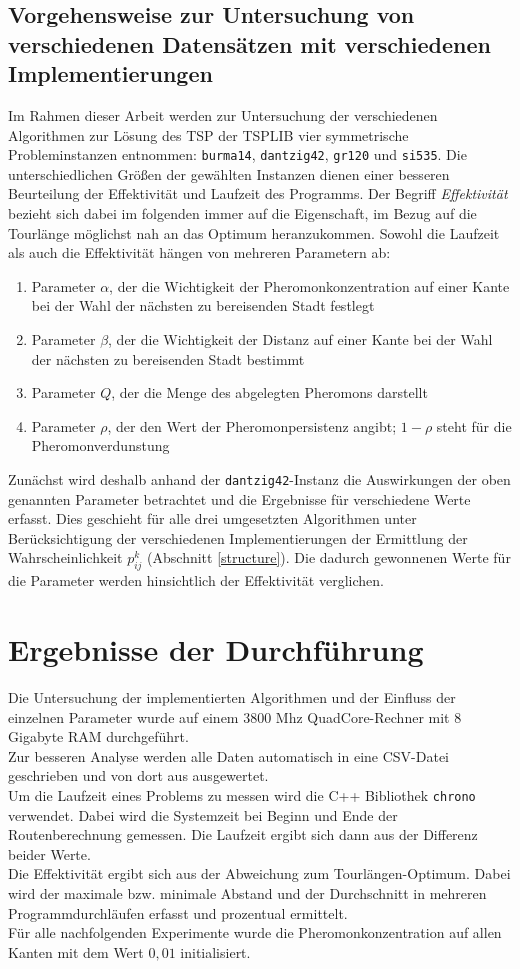 \documentclass[doktyp=barbeit, sprache=german]{TUBAFarbeiten}
\begin{document}
\subsection{Vorgehensweise zur Untersuchung von verschiedenen Datensätzen mit verschiedenen Implementierungen}
\label{sec:vorgehensweise}
Im Rahmen dieser Arbeit werden zur Untersuchung der verschiedenen Algorithmen zur Lösung des TSP der TSPLIB vier symmetrische Probleminstanzen entnommen: \texttt{burma14}, \texttt{dantzig42}, \texttt{gr120} und \texttt{si535}.
Die unterschiedlichen Größen der gewählten Instanzen dienen einer besseren Beurteilung der Effektivität und Laufzeit des Programms.
Der Begriff \textit{Effektivität} bezieht sich dabei im folgenden immer auf die Eigenschaft, im Bezug auf die Tourlänge möglichst nah an das Optimum heranzukommen. Sowohl die Laufzeit als auch die Effektivität hängen von mehreren Parametern ab:
\begin{enumerate}
\item Parameter $\alpha$, der die Wichtigkeit der Pheromonkonzentration auf einer Kante bei der Wahl der nächsten zu bereisenden Stadt festlegt
\item Parameter $\beta$, der die Wichtigkeit der Distanz auf einer Kante bei der Wahl der nächsten zu bereisenden Stadt bestimmt
\item Parameter $Q$, der die Menge des abgelegten Pheromons darstellt
\item Parameter $\rho$, der den Wert der Pheromonpersistenz angibt; $1 - \rho$ steht für die Pheromonverdunstung
\end{enumerate}
\newpage
Zunächst wird deshalb anhand der \texttt{dantzig42}-Instanz die Auswirkungen der oben genannten Parameter betrachtet und die Ergebnisse für verschiedene Werte erfasst.
Dies geschieht für alle drei umgesetzten Algorithmen unter Berücksichtigung der verschiedenen Implementierungen der Ermittlung der Wahrscheinlichkeit $p^k_{ij}$ (Abschnitt \ref{structure}).
Die dadurch gewonnenen Werte für die Parameter werden hinsichtlich der Effektivität verglichen. 
\newpage\section{Ergebnisse der Durchführung}
Die Untersuchung der implementierten Algorithmen und der Einfluss der einzelnen Parameter wurde auf einem 3800 Mhz QuadCore-Rechner mit 8 Gigabyte RAM durchgeführt. 
\\Zur besseren Analyse werden alle Daten automatisch in eine CSV-Datei geschrieben und von dort aus ausgewertet.
\\Um die Laufzeit eines Problems zu messen wird die C++ Bibliothek \texttt{chrono} verwendet. Dabei wird die Systemzeit bei Beginn und Ende der Routenberechnung gemessen. Die Laufzeit ergibt sich dann aus der Differenz beider Werte. 
\\Die Effektivität ergibt sich aus der Abweichung zum Tourlängen-Optimum. Dabei wird der maximale bzw. minimale Abstand und der Durchschnitt in mehreren Programmdurchläufen erfasst und prozentual ermittelt.
\\Für alle nachfolgenden Experimente wurde die Pheromonkonzentration auf allen Kanten mit dem Wert $0,01$ initialisiert.
\end{document}
